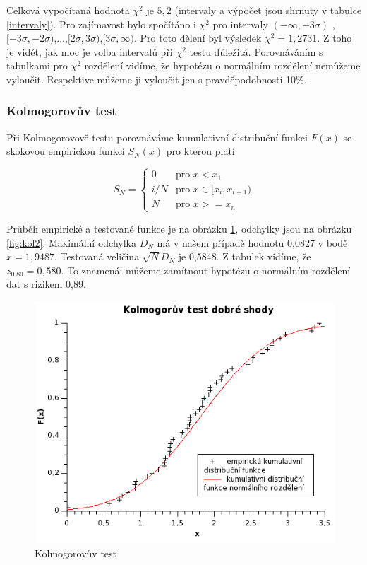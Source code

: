 \documentclass[12pt]{article}
\begin{document}
Celková vypočítaná hodnota $\chi^2$ je $5,2$ (intervaly a výpočet jsou shrnuty v tabulce \ref{intervaly}). Pro zajímavost bylo spočítáno i $\chi^2$ pro intervaly $(-\infty, -3\sigma)$ , $[-3\sigma,-2\sigma)$,...,$[2\sigma,3\sigma)$,$[3\sigma, \infty)$. Pro toto dělení byl výsledek $\chi^2 = 1,2731$. Z toho je vidět, jak moc je volba intervalů při $\chi^2$ testu důležitá. Porovnáváním s tabulkami pro $\chi^2$ rozdělení vidíme, že hypotézu o normálním rozdělení nemůžeme vyloučit. Respektive můžeme ji vyloučit jen s pravděpodobností 10\%. 
\clearpage

\subsubsection{Kolmogorovův test}
Při Kolmogorovově testu porovnáváme kumulativní distribuční funkci $F(x)$ se skokovou empirickou funkcí $S_N(x)$ pro kterou platí

$$S_N = \left\{ \begin{array}{cl}
0 & \mathrm{pro }\,\, x<x_1 \\
i/N & \mathrm{pro }\,\, x \in [x_i, x_{i+1})\\
N & \mathrm{pro }\,\, x>=x_n \end{array}\right. $$

Průběh empirické a testované funkce je na obrázku \ref{fig:kol1}, odchylky jsou na obrázku \ref{fig:kol2}. Maximální odchylka $D_N$ má v našem případě hodnotu 0,0827 v bodě $x = 1,9487$. Testovaná veličina $\sqrt{N} D_N$ je 0,5848. Z tabulek vidíme, že $z_{0.89} = 0,580$. To znamená: můžeme zamítnout hypotézu o normálním rozdělení dat s rizikem 0,89.

\begin{figure}[h!]
  \centering
  \includegraphics[width=13cm]{Graph2.png}
  \caption{Kolmogorovův test}
  \label{fig:kol1} 
\end{figure}
\end{document}
